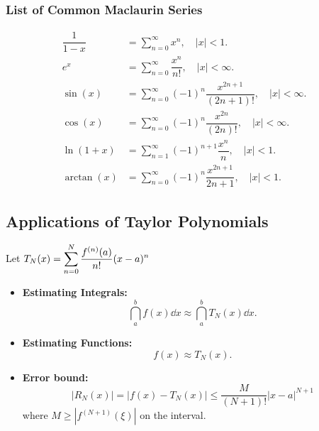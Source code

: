 \subsubsection{List of Common Maclaurin Series}
\begin{center}
\begin{tcolorbox}
    \begin{align*}
        \dfrac{1}{1-x} &= \sum_{n=0}^{\infty} x^n, \quad |x| < 1. \\
        e^x &= \sum_{n=0}^{\infty} \dfrac{x^n}{n!}, \quad |x| < \infty. \\
        \sin(x) &= \sum_{n=0}^{\infty} (-1)^n \dfrac{x^{2n+1}}{(2n+1)!}, \quad |x| < \infty. \\
        \cos(x) &= \sum_{n=0}^{\infty} (-1)^n \dfrac{x^{2n}}{(2n)!}, \quad |x| < \infty. \\
        \ln(1+x) &= \sum_{n=1}^{\infty} (-1)^{n+1} \dfrac{x^n}{n}, \quad |x| < 1. \\
        \arctan(x) &= \sum_{n=0}^{\infty} (-1)^n \dfrac{x^{2n+1}}{2n+1}, \quad |x| < 1.
    \end{align*}
\end{tcolorbox}
\end{center}

\subsection{Applications of Taylor Polynomials} 

\begin{center}
\begin{tcolorbox}
    Let $T_N(x) = \displaystyle\sum_{n=0}^N \dfrac{f^{(n)}(a)}{n!} (x-a)^n$
    \begin{itemize}
        \item \textbf{Estimating Integrals:}  
        \[\dint_a^b f(x) \dd x \approx \dint_a^b T_N(x) \dd x.\]
        
        \item \textbf{Estimating Functions:} 
        \[f(x) \approx T_N(x).\]
        
        \item \textbf{Error bound:} 
        \[|R_N(x)| = |f(x) - T_N(x)| \leq \dfrac{M}{(N+1)!}|x - a|^{N+1}\]
        where $M \geq |f^{(N+1)}(\xi)|$ on the interval.
    \end{itemize}
\end{tcolorbox}
\end{center}


